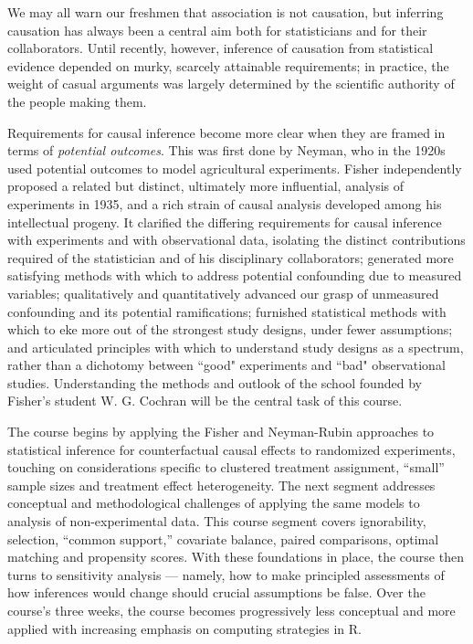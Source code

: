 \documentclass[12pt]{article}
\begin{document}
We may all warn our freshmen that association is not causation, but inferring causation has always been a central aim both for statisticians and for their collaborators. Until recently, however, inference of causation from statistical evidence depended on murky, scarcely attainable requirements; in practice, the weight of casual arguments was largely determined by the scientific authority of the people making them.

Requirements for causal inference become more clear when they are framed in terms of \emph{potential outcomes}.  This was first done by Neyman, who in the 1920s used potential outcomes to model agricultural experiments.  Fisher independently proposed a related but distinct, ultimately more influential, analysis of experiments in 1935, and a rich strain of causal analysis developed among his intellectual progeny. It clarified the differing requirements for causal inference with experiments and with observational data, isolating the distinct contributions required of the statistician and of his disciplinary collaborators; generated more satisfying methods with which to address potential confounding due to measured variables; qualitatively and quantitatively advanced our grasp of unmeasured confounding and its potential ramifications; furnished statistical methods with which to eke more out of the strongest study designs, under fewer assumptions; and articulated principles with which to understand study designs as a spectrum, rather than a dichotomy between ``good" experiments and ``bad" observational studies. Understanding the methods and outlook of the school founded by Fisher's student W. G. Cochran will be the central task of this course.

The course begins by applying the Fisher and Neyman-Rubin approaches to statistical inference for counterfactual causal effects to randomized experiments, touching on considerations specific to clustered treatment assignment, ``small'' sample sizes and treatment effect heterogeneity. The next segment addresses conceptual and methodological challenges of applying the same models to analysis of non-experimental data. This course segment covers ignorability, selection, ``common support,'' covariate balance, paired comparisons, optimal matching and propensity scores. With these foundations in place, the course then turns to sensitivity analysis --- namely, how to make principled assessments of how inferences would change should crucial assumptions be false. Over the course's three weeks, the course becomes progressively less conceptual and more applied with increasing emphasis on computing strategies in R.
\end{document}
